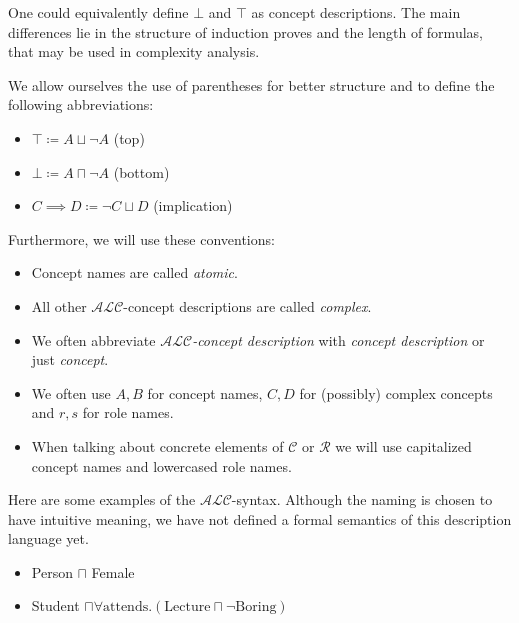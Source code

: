 \begin{note}
	One could equivalently define $\bot$ and $\top$ as concept descriptions.
	The main differences lie in the structure of induction proves and the length of formulas, that may be used in complexity analysis.
\end{note}

\begin{notation}
	We allow ourselves the use of parentheses for better structure and to define the following abbreviations:
	\begin{itemize}
		\item $ \top \coloneqq A \sqcup \neg A $ (top)
		\item $ \bot \coloneqq A \sqcap \neg A $ (bottom)
		\item $ C \implies D \coloneqq \neg C \sqcup D $ (implication)
	\end{itemize}
	Furthermore, we will use these conventions:
	\begin{itemize}
		\item Concept names are called \textit{atomic}.
		\item All other $\mathcal{ALC}$-concept descriptions are called \textit{complex}.
		\item We often abbreviate \textit{$\mathcal{ALC}$-concept description} with \textit{concept description} or just \textit{concept}.
		\item We often use $A, B$ for concept names, $C, D$ for (possibly) complex concepts and $r, s$ for role names.
		\item When talking about concrete elements of $\mathscr{C}$ or $\mathscr{R}$ we will use capitalized concept names and lowercased role names.
	\end{itemize}
\end{notation}

\begin{example}
	Here are some examples of the $\mathcal{ALC}$-syntax.
	Although the naming is chosen to have intuitive meaning, we have not defined a formal semantics of this description language yet.
	\begin{itemize}
		\item Person $\sqcap$ Female
		\item Student $\sqcap \forall \text{attends}.(\text{Lecture}\sqcap \neg \text{Boring})$
	\end{itemize}
\end{example}
